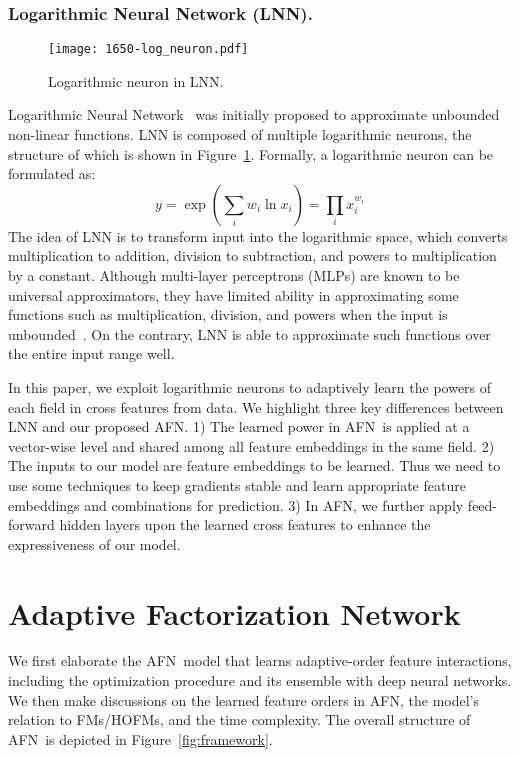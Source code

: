 \documentclass[letterpaper]{article} \usepackage{aaai20}  \usepackage{times}  \usepackage{helvet} \usepackage{courier}  \usepackage[hyphens]{url}  \usepackage{graphicx} \urlstyle{rm} \def\UrlFont{\rm}  \usepackage{graphicx}  \frenchspacing  \setlength{\pdfpagewidth}{8.5in}  \setlength{\pdfpageheight}{11in}
\newcommand{\model}{{AFN}~}
\newcommand{\modelns}{{AFN}}
\begin{document}
\subsubsection{Logarithmic Neural Network (LNN).}
\begin{figure}[t]
\centering  
	\texttt{[image: 1650-log\_neuron.pdf]} 
	\caption{Logarithmic neuron in LNN.}
	\label{fig:log_neuron}
\end{figure}
Logarithmic Neural Network~\cite{lnn} was initially proposed to approximate unbounded non-linear functions. LNN is composed of multiple logarithmic neurons, the structure of which is shown in Figure~\ref{fig:log_neuron}.
Formally, a logarithmic neuron can be formulated as:
\begin{equation}
\label{eq:lnn}
y = \exp(\sum_i w_i\ln x_i)
=\prod_i x_i^{w_i}
\end{equation}
The idea of LNN is to transform input into the logarithmic space, which converts multiplication to addition, division to subtraction, and powers to multiplication by a constant.
Although multi-layer perceptrons (MLPs) are known to be universal approximators, they have limited ability in approximating some functions such as multiplication, division, and powers when the input is unbounded~\cite{lnn}.
On the contrary, LNN is able to approximate such functions over the entire input range well.

In this paper, we exploit logarithmic neurons  
to adaptively learn the powers of each field in cross features from data.
We highlight three key differences between LNN and our proposed \modelns. 1) The learned power in \model is applied at a vector-wise level and shared among all feature embeddings in the same field. 2) The inputs to our model are feature embeddings to be learned. Thus we need to use some techniques to keep gradients stable and learn appropriate feature embeddings and combinations for prediction.
3) In \modelns, we further apply feed-forward hidden layers upon the learned cross features to enhance the expressiveness of our model.


\section{Adaptive Factorization Network}
 
We first elaborate the \model model that learns adaptive-order feature interactions, including the optimization procedure and its ensemble with deep neural networks. We then make discussions on the learned feature orders in \modelns, the model's relation to FMs/HOFMs, and the time complexity. The overall structure of \model is depicted in Figure~\ref{fig:framework}.
\end{document}
